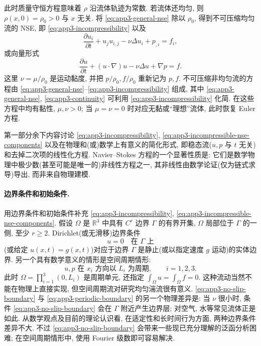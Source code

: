\hypertarget{appendix-03-page-355}{}
此时质量守恒方程意味着 $\rho$ 沿流体轨迹为常数. 若流体还均匀, 则 $\rho(x,0)=\rho_0>0$ 与 $x$ 无关. 将 
\eqref{eq:app3-general-nse} 除以 $\rho_0$, 得到不可压缩均匀流的 NSE, 即 
\eqref{eq:app3-incompressibility} 以及
\begin{equation}
\frac{\partial u_i}{\partial t}+u_ju_{i,j}-\nu\Delta u_i+p_{,i}=f_i,
\label{eq:app3-incompressible-nse-components}
\end{equation}
或向量形式
\[
\frac{\partial u}{\partial t}+(u\cdot\nabla)u-\nu\Delta u+\nabla p=f.
\]
这里 $\nu=\mu/\rho_0$ 是运动黏度, 并把 $p/\rho_0,f/\rho_0$ 重新记为 $p,f$. 不可压缩非均匀流的方程由 
\eqref{eq:app3-general-nse}--\eqref{eq:app3-incompressibility} 组成, 其中 
\eqref{eq:app3-general-nse}, 
\eqref{eq:app3-continuity} 可利用 
\eqref{eq:app3-incompressibility} 化简. 在这些方程中均有黏性, $\mu,\nu>0$; 当 $\mu=\nu=0$ 时对应无黏或``理想''流体, 此时恢复 Euler 方程.

第一部分余下内容讨论 
\eqref{eq:app3-incompressibility}, 
\eqref{eq:app3-incompressible-nse-components} 以及在物理和(或)数学上有意义的简化形式, 即稳态流($u,p$ 与 $t$ 无关)和去掉二次项的线性化方程. Navier--Stokes 方程的一个显著性质是: 它们是数学物理中极少数(甚至可能是唯一的)非线性方程之一, 其非线性由数学论证(仅为链式求导)导出, 而非来自物理建模.

\paragraph{边界条件和初始条件.}
用边界条件和初始条件补充 
\eqref{eq:app3-incompressibility}, 
\eqref{eq:app3-incompressible-nse-components}. 假设 $\Omega$ 是 $\mathbb R^3$ 中具有 $C^r$ 边界 $\Gamma$ 的有界开集, $\Omega$ 局部位于 $\Gamma$ 的一侧, 至少 $r\geq2$. Dirichlet(或无滑移)边界条件
\begin{equation}
u=0\quad\text{在 }\Gamma\text{ 上}
\label{eq:app3-no-slip-boundary}
\end{equation}
(或给定 $u(x,t)=g(x,t)$)对应于边界 $\Gamma$ 是静止(或以指定速度 $g$ 运动)的实体边界. 另一个具有数学意义的情形是空间周期情形:
\begin{equation*}
u,p\text{ 在 }x_i\text{ 方向以 }L_i\text{ 为周期},
\qquad i=1,2,3.
\tag{6'}
\label{eq:app3-periodic-boundary}
\end{equation*}
此时 $\Omega=\prod_{i=1}^3(0,L_i)$ 是周期单元, 还指定 $\int_\Omega u=\int_\Omega f=0$. 这种流动当然不能在物理上直接实现, 但空间周期流对研究均匀湍流很有意义. 
\eqref{eq:app3-no-slip-boundary} 与 
\eqref{eq:app3-periodic-boundary} 的另一个物理差异是: 当 $\nu$ 很小时, 条件 
\eqref{eq:app3-no-slip-boundary} 会在 $\Gamma$ 附近产生边界层; 对空气, 水等常见流体正是如此. 从数学观点及目前的理论认识看, 在适定性和长时间行为方面, 两种边界条件差异不大. 不过 
\eqref{eq:app3-no-slip-boundary} 会带来一些现已充分理解的泛函分析困难; 在空间周期情形中, 使用 Fourier 级数即可容易解决.

